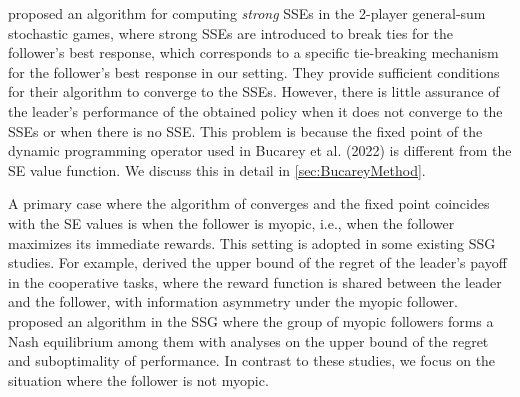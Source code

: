\documentclass{acml}
\begin{document}

\citet{Bucarey2022-ro} proposed an algorithm for computing \emph{strong} SSEs in the 2-player general-sum stochastic games, where strong SSEs are introduced to break ties for the follower’s best response, which corresponds to a specific tie-breaking mechanism for the follower’s best response in our setting.
They provide sufficient conditions for their algorithm to converge to the SSEs.
However, there is little assurance of the leader's performance of the obtained policy when it does not converge to the SSEs or when there is no SSE. 
This problem is because the fixed point of the dynamic programming operator used in Bucarey et al. (2022) is different from the SE value function.
We discuss this in detail in \cref{sec:BucareyMethod}. 

A primary case where the algorithm of \citet{Bucarey2022-ro} converges and the fixed point coincides with the SE values is when the follower is myopic, i.e., when the follower maximizes its immediate rewards. 
This setting is adopted in some existing SSG studies.
For example, \citet{Zhao2023-jc} derived the upper bound of the regret of the leader's payoff in the cooperative tasks, where the reward function is shared between the leader and the follower, with information asymmetry under the myopic follower.
\citet{Zhong2023-fn} proposed an algorithm in the SSG where the group of myopic followers forms a Nash equilibrium among them with analyses on the upper bound of the regret and suboptimality of performance.
In contrast to these studies, we focus on the situation where the follower is not myopic.
\end{document}
